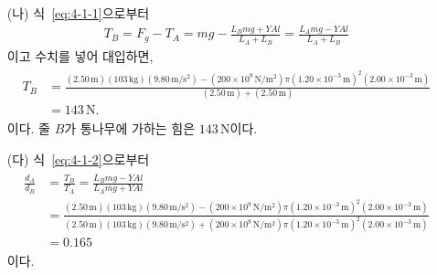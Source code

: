 \documentclass[floatfix,nofootinbib,superscriptaddress,fleqn]{revtex4-2}
\begin{document}
\begin{itemize}
  \item[(나)]
  식~\eqref{eq:4-1-1}으로부터
  \begin{align}
    T_B = F_g - T_A
    =mg - \frac{L_Bmg + YAl}{L_A+L_B}
    =\frac{L_Amg - YAl}{L_A+L_B}
  \end{align}
  이고 수치를 넣어 대입하면,
  \begin{align}
    \begin{split}
      T_B &=
      \frac{(2.50\,\mathrm{m})(103\,\mathrm{kg})
      (9.80\,\mathrm{m/s^2})  
      - (200\times 10^9\,\mathrm{N/m^2})
      \pi(1.20\times 10^{-3}\,\mathrm{m})^2
      (2.00\times 10^{-3}\,\mathrm{m})}
      {(2.50\,\mathrm{m})+(2.50\,\mathrm{m})} \\
      &=143\,\mathrm{N}.
    \end{split}
  \end{align}
  이다. 줄 $B$가 통나무에 가하는 힘은 $143\,\mathrm{N}$이다.
  \item[(다)]
  식~\eqref{eq:4-1-2}으로부터
  \begin{align}
    \begin{split}
      \frac{d_A}{d_B} &= \frac{T_B}{T_A}
      =\frac{L_B mg-YAl}{L_Amg + YAl} \\
      &= \frac{(2.50\,\mathrm{m})(103\,\mathrm{kg})
      (9.80\,\mathrm{m/s^2})  
      - (200\times 10^9\,\mathrm{N/m^2})
      \pi(1.20\times 10^{-3}\,\mathrm{m})^2
      (2.00\times 10^{-3}\,\mathrm{m})}
      {(2.50\,\mathrm{m})(103\,\mathrm{kg})
      (9.80\,\mathrm{m/s^2})  
      + (200\times 10^9\,\mathrm{N/m^2})
      \pi(1.20\times 10^{-3}\,\mathrm{m})^2
      (2.00\times 10^{-3}\,\mathrm{m})} \\
      &= 0.165
    \end{split}
  \end{align}
  이다.
\end{itemize}
\end{document}

